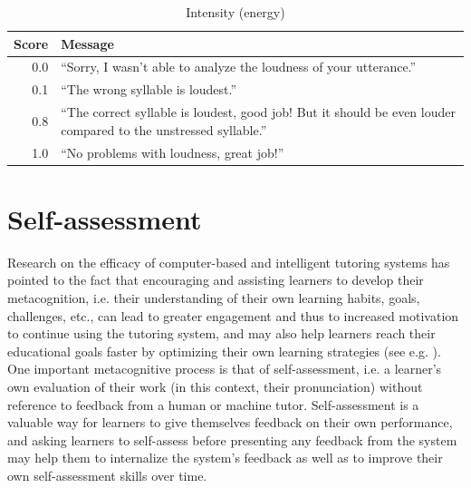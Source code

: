 \begin{table}
			\vspace{1.5em}
			
			\begin{subtable}{\textwidth}
				\centering
				\caption{Intensity (energy)}
				\begin{tabularx}{\textwidth}{rX}
					\toprule
					Score & Message \\
					\midrule 
					 0.0 & ``Sorry, I wasn't able to analyze the loudness of your utterance.'' \\
					 0.1 & ``The wrong syllable is loudest.'' \\
					0.8 & ``The correct syllable is loudest, good job! But it should be even louder compared to the unstressed syllable.'' \\
					1.0 & ``No problems with loudness, great job!'' \\
					\bottomrule
				\end{tabularx}
				\label{tab:explicit:messages:int}
			\end{subtable}	
			
			\label{tab:explicit:messages}
		\end{table}
		
		
		
	
		\section{Self-assessment}
		\label{sec:other:selfassess}
		
		

		
		Research on the efficacy of computer-based and intelligent tutoring systems has  pointed to the fact that encouraging and assisting learners to develop their metacognition, i.e. their understanding of their own learning habits, goals, challenges, etc., can lead to greater engagement and thus to increased motivation to continue using the tutoring system, and may also help learners reach their educational goals faster by optimizing their own learning strategies (see e.g. \textcite{Long2011,Long2013}). One important metacognitive process is that of self-assessment, i.e. a learner's own evaluation of their work (in this context, their pronunciation) without reference to feedback from a human or machine tutor. Self-assessment is a valuable way for learners to give themselves feedback on their own performance, and asking learners to self-assess before presenting any feedback from the system may help them to internalize the system's feedback as well as to improve their own self-assessment skills over time. 
 
